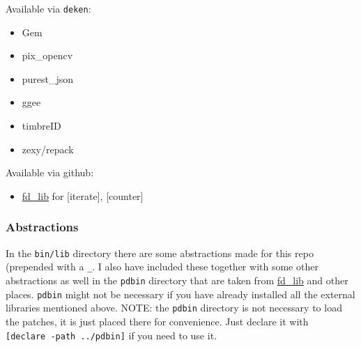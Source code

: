 Available via \texttt{deken}:

\begin{itemize}
\tightlist
\item
  Gem
\item
  pix\_opencv
\item
  purest\_json
\item
  ggee
\item
  timbreID
\item
  zexy/repack
\end{itemize}

Available via github:

\begin{itemize}
\tightlist
\item
  \href{https://github.com/fdch/fd_lib}{fd\_lib} for {[}iterate{]}, {[}counter{]}
\end{itemize}


\subsubsection{Abstractions}

In the \texttt{bin/lib} directory there are some abstractions made for this repo (prepended with a \texttt{\_}. I also have included these together with some other abstractions as well in the \texttt{pdbin} directory that are taken from \href{https://github.com/fdch/fd_lib}{fd\_lib} and other places. \texttt{pdbin} might not be necessary if you have already installed all the external libraries mentioned above. NOTE: the \texttt{pdbin} directory is not necessary to load the patches, it is just placed there for convenience. Just declare it with \texttt{{[}declare\ -path\ ../pdbin{]}} if you need to use it.


